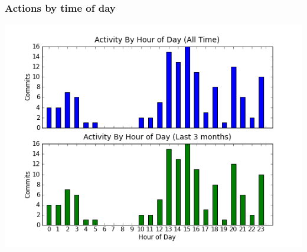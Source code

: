 \documentclass[12pt,A4]{book}
\begin{document}
\subsubsection{Actions by time of day}
\includegraphics[width=.8\textwidth]{svngraphs/actbytimeofday.png}
\end{document}
